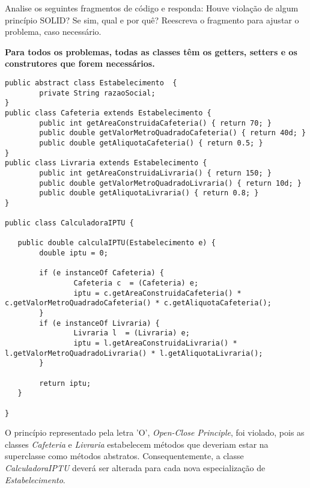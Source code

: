 \documentclass{lib/eng_softdoc}
\begin{document}
\makeheader

\problem Analise os seguintes fragmentos de código e responda: Houve violação de algum princípio SOLID? Se sim, qual e por quê? Reescreva o fragmento para ajustar o problema, caso necessário. 

\textbf{Para todos os problemas, todas as classes têm os getters, setters e os construtores que forem necessários.}

\subproblem
\begin{lstlisting}
public abstract class Estabelecimento  {
        private String razaoSocial;
}
public class Cafeteria extends Estabelecimento {
        public int getAreaConstruidaCafeteria() { return 70; }
        public double getValorMetroQuadradoCafeteria() { return 40d; }
        public double getAliquotaCafeteria() { return 0.5; }
}
public class Livraria extends Estabelecimento {
        public int getAreaConstruidaLivraria() { return 150; }
        public double getValorMetroQuadradoLivraria() { return 10d; }
        public double getAliquotaLivraria() { return 0.8; }
}

public class CalculadoraIPTU {

   public double calculaIPTU(Estabelecimento e) {
        double iptu = 0;

        if (e instanceOf Cafeteria) {
                Cafeteria c  = (Cafeteria) e;
                iptu = c.getAreaConstruidaCafeteria() * c.getValorMetroQuadradoCafeteria() * c.getAliquotaCafeteria();
        }
        if (e instanceOf Livraria) {
                Livraria l  = (Livraria) e;
                iptu = l.getAreaConstruidaLivraria() * l.getValorMetroQuadradoLivraria() * l.getAliquotaLivraria();
        }

        return iptu;
   }

}
\end{lstlisting}
\answer O princípio representado pela letra 'O', \textit{Open-Close Principle}, foi violado, 
pois as classes \textit{Cafeteria} e \textit{Livraria} estabelecem métodos que deveriam estar na superclasse como métodos abstratos.
Consequentemente, a classe \textit{CalculadoraIPTU} deverá ser alterada para cada nova especialização de \textit{Estabelecimento}.
\end{document}
